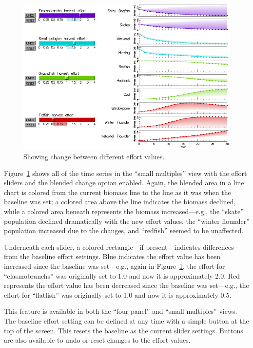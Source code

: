\begin{figure}[h]
	\centering
	\includegraphics[width=12cm]{figures/png/msprod_change.png}
	\caption{Showing change between different effort values.}
	\label{fig:msprod_change}
\end{figure}

Figure~\ref{fig:msprod_change} shows all of the time series in the ``small multiples'' view with the effort sliders and the blended change option enabled.  Again, the blended area in a line chart is colored from the current biomass line to the line as it was when the baseline was set; a colored area above the line indicates the biomass declined, while a colored area beneath represents the biomass increased---e.g., the ``skate'' population declined dramatically with the new effort values, the ``winter flounder'' population increased due to the changes, and ``redfish'' seemed to be unaffected.

Underneath each slider, a colored rectangle---if present---indicates differences from the baseline effort settings.  Blue indicates the effort value has been increased since the baseline was set---e.g., again in Figure~\ref{fig:msprod_change}, the effort for ``elasmobranchs'' was originally set to 1.0 and now it is approximately 2.0.  Red represents the effort value has been decreased since the baseline was set---e.g., the effort for ``flatfish'' was originally set to 1.0 and now it is approximately 0.5.

This feature is available in both the ``four panel'' and ``small multiples'' views.  The baseline effort setting can be defined at any time with a simple button at the top of the screen.  This resets the baseline as the current slider settings.  Buttons are also available to undo or reset changes to the effort values.

